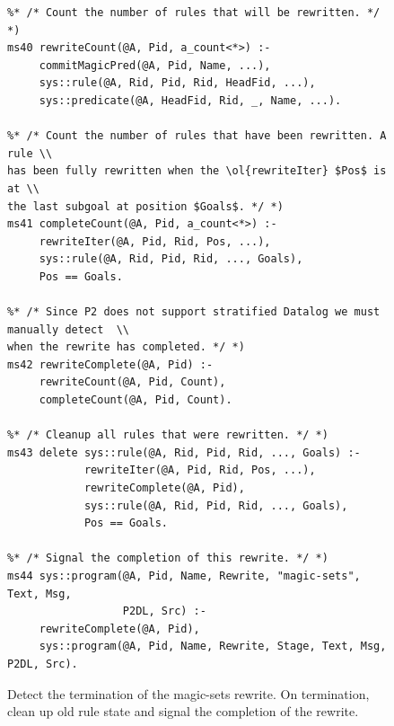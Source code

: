 \begin{figure}[!t]
\ssp
\centering
\begin{lstlisting}
%* /* Count the number of rules that will be rewritten. */ *)
ms40 rewriteCount(@A, Pid, a_count<*>) :-
     commitMagicPred(@A, Pid, Name, ...),
     sys::rule(@A, Rid, Pid, Rid, HeadFid, ...),
     sys::predicate(@A, HeadFid, Rid, _, Name, ...).
	
%* /* Count the number of rules that have been rewritten. A rule \\ 
has been fully rewritten when the \ol{rewriteIter} $Pos$ is at \\
the last subgoal at position $Goals$. */ *)
ms41 completeCount(@A, Pid, a_count<*>) :-
     rewriteIter(@A, Pid, Rid, Pos, ...),
     sys::rule(@A, Rid, Pid, Rid, ..., Goals),
     Pos == Goals.
	
%* /* Since P2 does not support stratified Datalog we must manually detect  \\
when the rewrite has completed. */ *)
ms42 rewriteComplete(@A, Pid) :- 
     rewriteCount(@A, Pid, Count),
     completeCount(@A, Pid, Count).

%* /* Cleanup all rules that were rewritten. */ *)
ms43 delete sys::rule(@A, Rid, Pid, Rid, ..., Goals) :-
            rewriteIter(@A, Pid, Rid, Pos, ...),
            rewriteComplete(@A, Pid),
            sys::rule(@A, Rid, Pid, Rid, ..., Goals),
            Pos == Goals.

%* /* Signal the completion of this rewrite. */ *)
ms44 sys::program(@A, Pid, Name, Rewrite, "magic-sets", Text, Msg, 
                  P2DL, Src) :-
     rewriteComplete(@A, Pid),
     sys::program(@A, Pid, Name, Rewrite, Stage, Text, Msg, P2DL, Src).

\end{lstlisting}
\caption{\label{ch:magic:fig:rewrite10} Detect the termination of the magic-sets rewrite. 
On termination, clean up old rule state and signal the completion of the rewrite.}
\end{figure}

